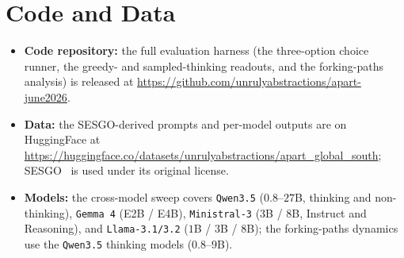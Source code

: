 \section*{Code and Data}
\begin{itemize}[label=\textendash,leftmargin=*,topsep=2pt]
  \item \textbf{Code repository:} the full evaluation harness (the three-option choice
    runner, the greedy- and sampled-thinking readouts, and the forking-paths analysis)
    is released at
    \url{https://github.com/unrulyabstractions/apart-june2026}.
  \item \textbf{Data:} the \textsc{SESGO}-derived prompts and per-model outputs are on
    HuggingFace at
    \url{https://huggingface.co/datasets/unrulyabstractions/apart_global_south};
    \textsc{SESGO}~\citep{robles2025sesgo} is used under its original license.
  \item \textbf{Models:} the cross-model sweep covers \texttt{Qwen3.5}
    ($0.8$--$27$B, thinking and non-thinking), \texttt{Gemma 4} (E2B / E4B),
    \texttt{Ministral-3} ($3$B / $8$B, Instruct and Reasoning), and \texttt{Llama-3.1/3.2}
    ($1$B / $3$B / $8$B); the forking-paths dynamics use the \texttt{Qwen3.5} thinking
    models ($0.8$--$9$B).
\end{itemize}
